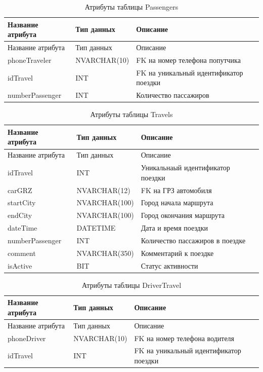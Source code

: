 \begin{xltabular}{\textwidth}{|X|X|X|}
	\caption{Атрибуты таблицы Passengers\label{ssevsws:table}}\\ \hline
	\centrow Название атрибута & \centrow Тип данных & \centrow Описание \\ \hline
	\endfirsthead
	\centrow Название атрибута & \centrow Тип данных & \centrow Описание \\ \hline 
	\finishhead
	phoneTraveler & NVARCHAR(10) & FK на номер телефона попутчика \\ \hline 
	idTravel & INT & FK на уникальный идентификатор поездки \\ \hline 
	numberPassenger & INT & Количество пассажиров \\ \hline  
\end{xltabular}

\begin{xltabular}{\textwidth}{|X|X|X|}
	\caption{Атрибуты таблицы Travels\label{tb}}\\ \hline
	\centrow Название атрибута & \centrow Тип данных & \centrow Описание \\ \hline
	\endfirsthead
	\centrow Название атрибута & \centrow Тип данных & \centrow Описание \\ \hline 
	\finishhead
	idTravel & INT & Уникальнаый идентификатор поездки \\ \hline 
	carGRZ & NVARCHAR(12) & FK на ГРЗ автомобиля \\ \hline 
	startCity & NVARCHAR(100) & Город начала маршрута \\ \hline
	endCity & NVARCHAR(100) & Город окончания маршрута \\ \hline
	dateTime & DATETIME & Дата и время поездки \\ \hline
	numberPassenger & INT & Количество пассажиров в поездке \\ \hline
	comment & NVARCHAR(350) & Комментарий к поездке \\ \hline
	isActive & BIT & Статус активности \\ \hline  
\end{xltabular}

\begin{xltabular}{\textwidth}{|X|X|X|}
	\caption{Атрибуты таблицы DriverTravel\label{ssevsws:table}}\\ \hline
	\centrow Название атрибута & \centrow Тип данных & \centrow Описание \\ \hline
	\endfirsthead
	\centrow Название атрибута & \centrow Тип данных & \centrow Описание \\ \hline 
	\finishhead
	phoneDriver & NVARCHAR(10) & FK на номер телефона водителя \\ \hline 
	idTravel & INT & FK на уникальный идентификатор поездки \\ \hline 
\end{xltabular}

